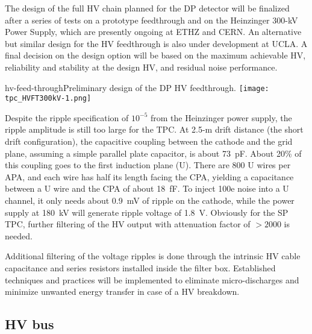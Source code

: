 The design of the full HV chain planned %
for the DP detector will be finalized  after a series of tests on a prototype feedthrough and on the Heinzinger 300-kV Power Supply, which are presently ongoing at ETHZ and CERN. An alternative but similar design for the HV feedthrough is also under development at UCLA. A final decision on the design option will be based on the maximum achievable HV, reliability and stability at the design HV, and residual noise performance.


\begin{cdrfigure}[HV feedthrough]{hv-feed-through}{Preliminary design of the DP HV feedthrough.}
\texttt{[image: tpc\_HVFT300kV-1.png]}
\end{cdrfigure}


Despite the ripple specification of $10^{-5}$ from the Heinzinger power supply, the ripple amplitude is still too large for the TPC.  At 2.5-m drift distance (the short drift configuration), the capacitive coupling between the cathode and the grid plane, assuming a simple parallel plate capacitor, is about 73~pF.  About 20\% of this coupling goes to the first induction plane (U).  There are 800 U wires per APA, and each wire has half its length facing the CPA, yielding a  capacitance between a U wire and the CPA of about 18~fF.  To inject 100e noise into a U channel, it only needs about 0.9~mV of ripple on the cathode, while the power supply at 180~kV will generate ripple voltage of 1.8~V.  Obviously for the SP TPC, further filtering of the HV output with attenuation factor of $>2000$ is needed. 

Additional filtering of the voltage ripples is done
through the intrinsic HV cable capacitance and series resistors
installed inside the filter box. Established techniques and practices
will be implemented to eliminate micro-discharges and minimize
unwanted energy transfer in case of a HV breakdown.


\subsection{HV bus}

